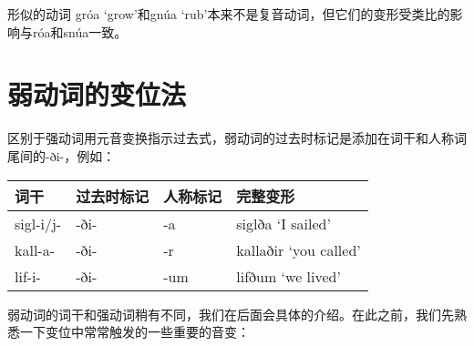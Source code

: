 形似的动词 gróa `grow‌'和gnúa `rub‌'本来不是复音动词，但它们的变形受类比的影响与róa和snúa一致。

\section{弱动词的变位法}\label{弱动词的变位法}

区别于强动词用元音变换指示过去式，弱动词的过去时标记是添加在词干和人称词尾间的-ði-，例如：

\begin{longtable}{llll}
    \toprule
    词干        & 过去时标记 & 人称标记 & 完整变形                  \\
    \midrule
    \endhead
    \bottomrule
    \endfoot
    sigl-i/j- & -ði-  & -a   & siglða `I sailed‌'     \\
    kall-a-   & -ði-  & -r   & kallaðir `you called‌' \\
    lif-i-    & -ði-  & -um  & lifðum `we lived‌'     \\
\end{longtable}

弱动词的词干和强动词稍有不同，我们在后面会具体的介绍。在此之前，我们先熟悉一下变位中常常触发的一些重要的音变：

